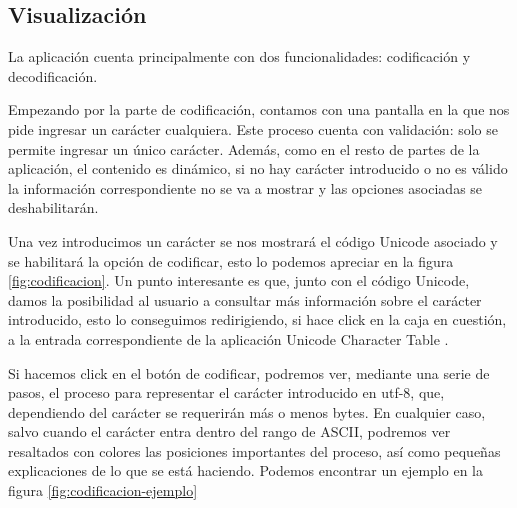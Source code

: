 \documentclass{article}
\begin{document}
\subsection{Visualización}
La aplicación cuenta principalmente con dos funcionalidades: codificación y
decodificación.

Empezando por la parte de codificación, contamos con una pantalla en la que nos
pide ingresar un carácter cualquiera. Este proceso cuenta con validación: solo
se permite ingresar un único carácter. Además, como en el resto de partes de la
aplicación, el contenido es dinámico, si no hay carácter introducido o no es
válido la información correspondiente no se va a mostrar y las opciones
asociadas se deshabilitarán.

Una vez introducimos un carácter se nos mostrará el código Unicode asociado y se
habilitará la opción de codificar, esto lo podemos apreciar en la figura
\ref{fig:codificacion}. Un punto interesante es que, junto con el código
Unicode, damos la posibilidad al usuario a consultar más información sobre el
carácter introducido, esto lo conseguimos redirigiendo, si hace click en la caja
en cuestión, a la entrada correspondiente de la aplicación Unicode Character
Table \cite{unicode-table-source}.

Si hacemos click en el botón de codificar, podremos ver, mediante una serie de
pasos, el proceso para representar el carácter introducido en utf-8, que,
dependiendo del carácter se requerirán más o menos bytes. En cualquier caso,
salvo cuando el carácter entra dentro del rango de ASCII, podremos ver
resaltados con colores las posiciones importantes del proceso, así como pequeñas
explicaciones de lo que se está haciendo. Podemos encontrar un ejemplo en la
figura \ref{fig:codificacion-ejemplo}
\end{document}

